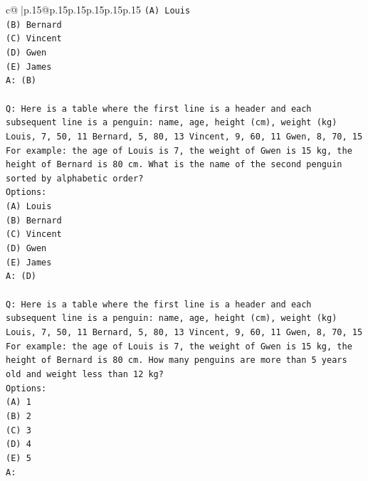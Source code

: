 \documentclass{article}
\begin{document}
{\begin{supertabular}{c@{$\;$}|p{.15\linewidth}@{}p{.15\linewidth}p{.15\linewidth}p{.15\linewidth}p{.15\linewidth}p{.15\linewidth}}
{{{\texttt{(A) Louis} \\
\texttt{(B) Bernard} \\
\texttt{(C) Vincent} \\
\texttt{(D) Gwen} \\
\texttt{(E) James} \\
\texttt{A: (B)} \\
\\ 
\texttt{Q: Here is a table where the first line is a header and each subsequent line is a penguin:  name, age, height (cm), weight (kg) Louis, 7, 50, 11 Bernard, 5, 80, 13 Vincent, 9, 60, 11 Gwen, 8, 70, 15  For example: the age of Louis is 7, the weight of Gwen is 15 kg, the height of Bernard is 80 cm.  What is the name of the second penguin sorted by alphabetic order?} \\
\texttt{Options:} \\
\texttt{(A) Louis} \\
\texttt{(B) Bernard} \\
\texttt{(C) Vincent} \\
\texttt{(D) Gwen} \\
\texttt{(E) James} \\
\texttt{A: (D)} \\
\\ 
\texttt{Q: Here is a table where the first line is a header and each subsequent line is a penguin:  name, age, height (cm), weight (kg) Louis, 7, 50, 11 Bernard, 5, 80, 13 Vincent, 9, 60, 11 Gwen, 8, 70, 15  For example: the age of Louis is 7, the weight of Gwen is 15 kg, the height of Bernard is 80 cm.  How many penguins are more than 5 years old and weight less than 12 kg?} \\
\texttt{Options:} \\
\texttt{(A) 1} \\
\texttt{(B) 2} \\
\texttt{(C) 3} \\
\texttt{(D) 4} \\
\texttt{(E) 5} \\
\texttt{A:} \\
            }
        }
    }
     \\ \\


\end{supertabular}}
\end{document}
